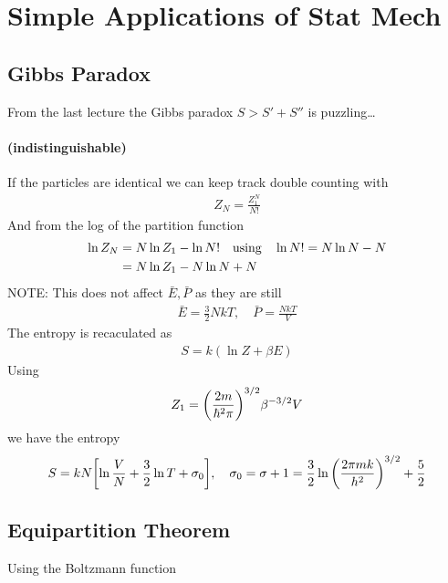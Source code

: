 \documentclass[../main.tex]{subfiles}
\begin{document}
\pagestyle{fancy}


\section{Simple Applications of Stat Mech}
\subsection{Gibbs Paradox}
From the last lecture the Gibbs paradox $S > S' + S''$ is puzzling\dots

\paragraph{(indistinguishable)} If the particles are identical we can keep track double counting with
\begin{align*}
    Z_N = \frac{Z_1^N}{N!}
\end{align*}
And from the log of the partition function
\begin{align*}
    \ln Z_N &= N\ln Z_1 - \ln N! \qusing \ln N! = N \ln N - N \\
    &= N \ln Z_1 - N\ln N + N
\end{align*}
NOTE: This does not affect $\bar E, \bar P$ as they are still
\begin{align*}
    \bar E = \frac{3}{2} N kT, \quad \bar P = \frac{NkT}{V}
\end{align*}
The entropy is recaculated as
\begin{align*}
    S = k (\ln Z + \beta E)
\end{align*}
Using
\begin{align*}
    Z_1 = \qt(\frac{2m}{\hbar^2 \pi})^{3/2} \beta^{-3/2} V
\end{align*}
we have the entropy
\begin{align*}
    S = kN \qt[
        \ln\frac{V}{N} + \frac{3}{2} \ln T + \sigma_0
    ], \quad \sigma_0 = \sigma + 1 = \frac{3}{2}\ln\qt(\frac{2\pi mk}{h^2})^{3/2} + \frac{5}{2}
\end{align*}

\subsection{Equipartition Theorem} Using the Boltzmann function
\end{document}

